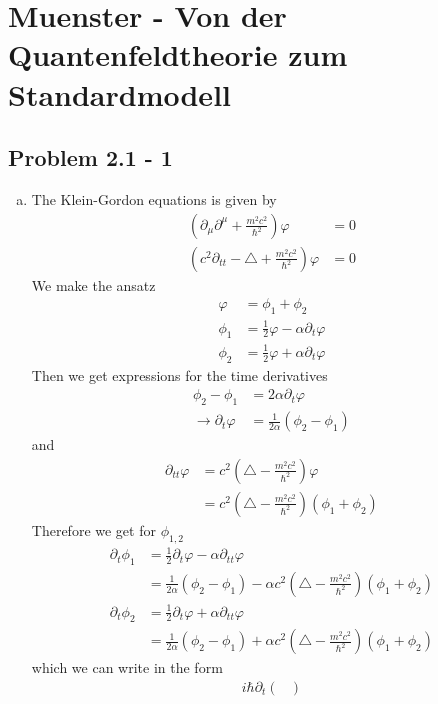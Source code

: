 \documentclass[../main.tex]{subfiles}
\begin{document}
\section{{\sc Muenster} - Von der Quantenfeldtheorie zum Standardmodell} 
\subsection{Problem 2.1 - 1}
\begin{enumerate}[(a)]
\item The Klein-Gordon equations is given by
\begin{align}
    \left(\partial_\mu\partial^\mu+\frac{m^2c^2}{\hbar^2}\right)\varphi&=0\\
    \left(c^2\partial_{tt}-\triangle+\frac{m^2c^2}{\hbar^2}\right)\varphi&=0
\end{align}
We make the ansatz
\begin{align}
    \varphi&=\phi_1+\phi_2\\
    \phi_1&=\frac{1}{2}\varphi-\alpha\partial_t\varphi\\
    \phi_2&=\frac{1}{2}\varphi+\alpha\partial_t\varphi
\end{align}
Then we get expressions for the time derivatives 
\begin{align}
    \phi_2-\phi_1&=2\alpha\partial_t\varphi\\
    \rightarrow\partial_t\varphi&=\frac{1}{2\alpha}(\phi_2-\phi_1)
\end{align}
and
\begin{align}
    \partial_{tt}\varphi&=c^2\left(\triangle-\frac{m^2c^2}{\hbar^2}\right)\varphi\\
    &=c^2\left(\triangle-\frac{m^2c^2}{\hbar^2}\right)(\phi_1+\phi_2)
\end{align}
Therefore we get for $\phi_{1,2}$
\begin{align}
    \partial_t\phi_1
    &=\frac{1}{2}\partial_t\varphi-\alpha\partial_{tt}\varphi\\
    &=\frac{1}{2\alpha}(\phi_2-\phi_1)-\alpha c^2\left(\triangle-\frac{m^2c^2}{\hbar^2}\right)(\phi_1+\phi_2)\\
    \partial_t\phi_2
    &=\frac{1}{2}\partial_t\varphi+\alpha\partial_{tt}\varphi\\
    &=\frac{1}{2\alpha}(\phi_2-\phi_1)+\alpha c^2\left(\triangle-\frac{m^2c^2}{\hbar^2}\right)(\phi_1+\phi_2)
\end{align}
which we can write in the form
\begin{align}
i\hbar\partial_t\begin{pmatrix}

\end{pmatrix}
\end{align}
\end{enumerate}
\end{document}
